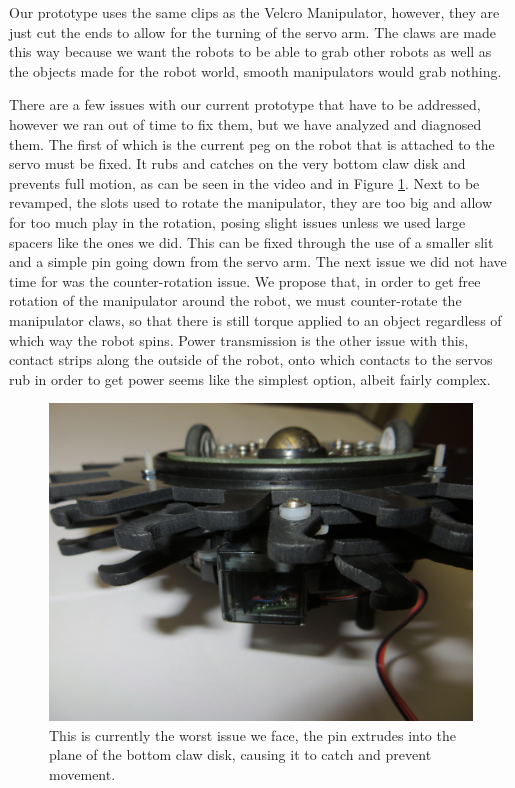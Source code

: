 \documentclass[12pt]{article}
\begin{document}
Our prototype uses the same clips as the Velcro Manipulator, however, they are just cut the ends to allow for the turning of the servo arm. The claws are made this way because we want the robots to be able to grab other robots as well as the objects made for the robot world, smooth manipulators would grab nothing. 

There are a few issues with our current prototype that have to be addressed, however we ran out of time to fix them, but we have analyzed and diagnosed them. The first of which is the current peg on the robot that is attached to the servo must be fixed. It rubs and catches on the very bottom claw disk and prevents full motion, as can be seen in the video and in Figure \ref{fig:problem}. Next to be revamped, the slots used to rotate the manipulator, they are too big and allow for too much play in the rotation, posing slight issues unless we used large spacers like the ones we did. This can be fixed through the use of a smaller slit and a simple pin going down from the servo arm. The next issue we did not have time for was the counter-rotation issue. We propose that, in order to get free rotation of the manipulator around the robot, we must counter-rotate the manipulator claws, so that there is still torque applied to an object regardless of which way the robot spins. Power transmission is the other issue with this, contact strips along the outside of the robot, onto which contacts to the servos rub in order to get power seems like the simplest option, albeit fairly complex.

\begin{figure}[h!]
\begin{center}
\includegraphics[width=4.5in]{Figs/bottom_problem.JPG} 
\end{center}
\caption{This is currently the worst issue we face, the pin extrudes into the plane of the bottom claw disk, causing it to catch and prevent movement.}
\label{fig:problem}
\end{figure}
\end{document}
